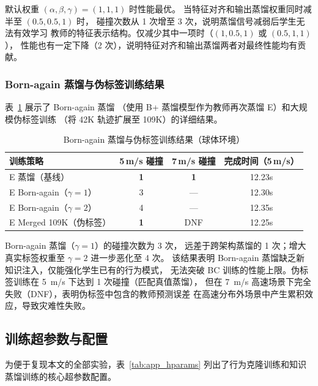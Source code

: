 \documentclass[12pt,a4paper]{article}
\numberwithin{equation}{section}
\numberwithin{figure}{section}
\numberwithin{table}{section}
\begin{document}
\noindent 默认权重 $(\alpha, \beta, \gamma) = (1, 1, 1)$ 时性能最优。
当特征对齐和输出蒸馏权重同时减半至 $(0.5, 0.5, 1)$ 时，
碰撞次数从 1 次增至 3 次，说明蒸馏信号减弱后学生无法有效学习
教师的特征表示结构。仅减少其中一项时（$(1, 0.5, 1)$ 或 $(0.5, 1, 1)$），
性能也有一定下降（2 次），说明特征对齐和输出蒸馏两者对最终性能均有贡献。

\subsubsection{Born-again 蒸馏与伪标签训练结果}

表~\ref{tab:app_born} 展示了 Born-again 蒸馏
（使用 B+ 蒸馏模型作为教师再次蒸馏 E）和大规模伪标签训练
（将 42K 轨迹扩展至 109K）的详细结果。

\begin{table}[H]
\centering
\caption{Born-again 蒸馏与伪标签训练结果（球体环境）}
\label{tab:app_born}
\begin{tabular}{lccc}
\toprule
\textbf{训练策略} & 5\,m/s 碰撞 & 7\,m/s 碰撞 & 完成时间（5\,m/s） \\
\midrule
E 蒸馏（基线） & \textbf{1} & \textbf{1} & 12.23s \\
E Born-again（$\gamma=1$） & 3 & --- & 12.30s \\
E Born-again（$\gamma=2$） & 4 & --- & 12.35s \\
E Merged 109K（伪标签） & \textbf{1} & DNF & 12.25s \\
\bottomrule
\end{tabular}
\end{table}

\noindent Born-again 蒸馏（$\gamma=1$）的碰撞次数为 3 次，
远差于跨架构蒸馏的 1 次；增大真实标签权重至 $\gamma=2$ 进一步恶化至 4 次。
该结果表明 Born-again 蒸馏缺乏新知识注入，仅能强化学生已有的行为模式，
无法突破 BC 训练的性能上限。伪标签训练在 5~m/s 下达到 1 次碰撞（匹配真值蒸馏），
但在 7~m/s 高速场景下完全失败（DNF），表明伪标签中包含的教师预测误差
在高速分布外场景中产生累积效应，导致灾难性失败。

\subsection{训练超参数与配置}
\label{app:hparams}

为便于复现本文的全部实验，表~\ref{tab:app_hparams} 列出了行为克隆训练和知识蒸馏训练的核心超参数配置。
\end{document}
